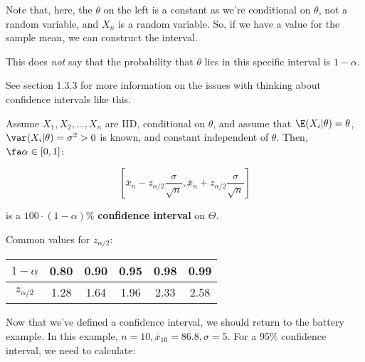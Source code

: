 \documentclass[a4paper]{article}
\begin{document}
                \begin{warn}
                    Note that, here, the $\theta$ on the left is a constant as
                    we're conditional on $\theta$, not a random variable, and
                    $X_n$ is a random variable. So, if we have a value for the
                    sample mean, we can construct the interval.

                    This does \textit{not} say that the probability that
                    $\theta$ lies in this specific interval is $1 - \alpha$.

                    See section 1.3.3 for more information on the issues with
                    thinking about confidence intervals like this.
                \end{warn}

                \begin{definition}
                    Assume $X_1, X_2, ..., X_n$ are IID, conditional on
                    $\theta$, and assume that $\E(X_i | \theta) = \theta$,
                    $\var(X_i | \theta) = \sigma^2 > 0$ is known, and constant
                    independent of $\theta$. Then, $\fa \alpha \in [0, 1]$:

                    \[
                        \left[\bar x_n - z_{\alpha/2}\frac{\sigma}{\sqrt{n}},
                        \bar x_n + z_{\alpha/2} \frac{\sigma}{\sqrt{n}}\right]
                    \]

                    is a $100 \cdot (1 - \alpha)\%$ \textbf{confidence interval}
                    on $\Theta$.
                \end{definition}

                Common values for $z_{\alpha/2}$:

                \begin{center}
                    \begin{tabular}{c | c c c c c}
                        $1 - \alpha$ & 0.80 & 0.90 & 0.95 & 0.98 & 0.99 \\
                        \hline
                        $z_{\alpha/2}$ & 1.28 & 1.64 & 1.96 & 2.33 & 2.58
                    \end{tabular}
                \end{center}

                Now that we've defined a confidence interval, we should return
                to the battery example. In this example, $n = 10, \bar x_{10} =
                86.8, \sigma = 5$. For a 95\% confidence interval, we need to
                calculate:
\end{document}
